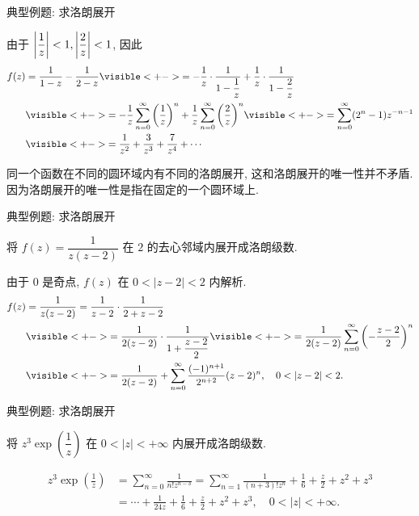 \begin{frame}{典型例题: 求洛朗展开}
\begin{solutionc}
 由于 $\left|\dfrac1z\right|<1,\left|\dfrac2z\right|<1$, \onslide<+->
因此
\begin{align*}
f(z)&=\frac1{1-z}-\frac1{2-z}
	\visible<+->{=-\frac1z\cdot\frac1{1-\dfrac1z}+\frac1z\cdot\frac1{1-\dfrac2z}}\\
&\visible<+->{=-\frac1z\sum_{n=0}^\infty \left(\frac1z\right)^n+\frac1z\sum_{n=0}^\infty\left(\frac2z\right)^n}
	\visible<+->{=\sum_{n=0}^\infty(2^n-1)z^{-n-1}}\\
&\visible<+->{=\frac1{z^2}+\frac3{z^3}+\frac7{z^4}+\cdots}
\end{align*}
\end{solutionc}
\onslide<+->
同一个函数在不同的圆环域内有不同的洛朗展开, 这和洛朗展开的唯一性并不矛盾.
\onslide<+->
因为洛朗展开的唯一性是指在固定的一个圆环域上.
\end{frame}


\begin{frame}{典型例题: 求洛朗展开}
\begin{example}
将 $f(z)=\dfrac1{z(z-2)}$ 在 $2$ 的去心邻域内展开成洛朗级数.
\end{example}
\begin{solution}
由于 $0$ 是奇点, $f(z)$ 在 $0<|z-2|<2$ 内解析.
\onslide<+->
\begin{align*}
f(z)&=\frac1{z(z-2)}=\frac1{z-2}\cdot\frac1{2+z-2}\\
&\visible<+->{=\frac1{2(z-2)}\cdot\frac1{1+\dfrac{z-2}2}}
	\visible<+->{=\frac1{2(z-2)}\sum_{n=0}^\infty\left(-\frac{z-2}2\right)^n}\\
&\visible<+->{=\frac1{2(z-2)}+\sum_{n=0}^\infty\frac{(-1)^{n+1}}{2^{n+2}}(z-2)^n,\quad 0<|z-2|<2.}
\end{align*}
\vspace{-5pt}
\end{solution}
\end{frame}


\begin{frame}{典型例题: 求洛朗展开}
\begin{exercise}
将 $z^3\exp\left(\dfrac1z\right)$ 在 $0<|z|<+\infty$ 内展开成洛朗级数.
\end{exercise}
\begin{answer}
\vspace{-\baselineskip}
\begin{align*}
z^3\exp\left(\frac1z\right)&=\sum_{n=0}^\infty\frac{1}{n!z^{n-3}}
=\sum_{n=1}^\infty\frac1{(n+3)! z^n}+\frac16+\frac z2+z^2+z^3\\
&=\cdots+\frac1{24z}+\frac16+\frac z2+z^2+z^3,\quad 0<|z|<+\infty.
\end{align*}
\end{answer}
\end{frame}


